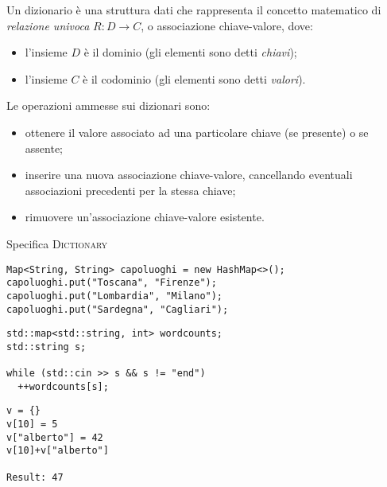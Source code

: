 Un dizionario è una struttura dati che rappresenta il concetto matematico di \emph{relazione univoca} \(R : D \to C\), o associazione chiave-valore, dove:
\begin{itemize}
	\item l'insieme \(D\) è il dominio (gli elementi sono detti \emph{chiavi});
	\item l'insieme \(C\) è il codominio (gli elementi sono detti \emph{valori}).
\end{itemize}

Le operazioni ammesse sui dizionari sono:
\begin{itemize}
	\item ottenere il valore associato ad una particolare chiave (se presente) o \Nil se assente;
	\item inserire una nuova associazione chiave-valore, cancellando eventuali associazioni precedenti per la stessa chiave;
	\item rimuovere un'associazione chiave-valore esistente.
\end{itemize}

\begin{algorithm}[H]
	\caption[Specifica dizionario]{Specifica \textsc{Dictionary}}
	
\end{algorithm}

\begin{code}
\begin{verbatim}
Map<String, String> capoluoghi = new HashMap<>();
capoluoghi.put("Toscana", "Firenze");
capoluoghi.put("Lombardia", "Milano");
capoluoghi.put("Sardegna", "Cagliari");
\end{verbatim}
\end{code}

\begin{code}
\begin{verbatim}
std::map<std::string, int> wordcounts;
std::string s;

while (std::cin >> s && s != "end")
  ++wordcounts[s];
\end{verbatim}
\end{code}

\begin{code}
\begin{verbatim}
v = {}
v[10] = 5
v["alberto"] = 42
v[10]+v["alberto"]

Result: 47
\end{verbatim}
\end{code}

